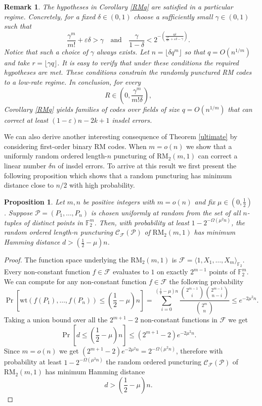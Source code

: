 \documentclass[draft, onecolumn, 11pt]{IEEEtran}
\newtheorem{proposition}[theorem]{Proposition}
\newtheorem{remark}[theorem]{Remark}
\newcommand{\F}{\mathbb{F}}
\begin{document}
\begin{remark}
    The hypotheses in Corollary \ref{RMq} are satisfied in a particular regime. Concretely, for a fixed $\delta \in (0,1)$ choose a sufficiently small $\gamma \in (0,1)$ such that 
    $$\frac{\gamma^m}{m!}+ \varepsilon\delta > \gamma \quad \text{and} \quad \frac{\gamma}{1-\delta} < 2^{-\left( \frac{4\delta}{\frac{\gamma^m}{m!}+\varepsilon\delta-\gamma}\right)}.$$
    Notice that such a choice of $\gamma$ always exists. Let $n=\lfloor\delta q^m\rfloor$ so that $q = O(n^{1/m})$ and take $r=\lfloor\gamma q\rfloor$. It is easy to verify that under these conditions the required hypotheses are met. These conditions constrain the randomly punctured RM codes to a low-rate regime. In conclusion, for every
    $$R\in\left(0,\frac{\gamma^m}{m!\delta}\right),$$ 
    Corollary \ref{RMq} yields families of codes over fields of size $q=O(n^{1/m})$ that can correct at least $(1 - \varepsilon)n - 2k + 1$ insdel errors.
\end{remark}

We can also derive another interesting consequence of  Theorem \ref{ultimate} by considering first-order binary RM codes. When $m = o(n)$ we show that a uniformly random ordered length-$n$ puncturing of $\mathrm{RM}_2(m,1)$ can correct a linear number $\delta n$ of insdel errors. To arrive at this result we first present the following proposition which shows that a random puncturing has minimum distance close to $n/2$ with high probability. 

\begin{proposition} \label{RM2mindist}
    Let $m,n$ be positive integers with $m = o(n)$ and fix $\mu \in \left(0,\frac{1}{2}\right)$. Suppose $\mathcal{P} = (P_1, \dots, P_n)$ is chosen uniformly at random from the set of all $n$-tuples of distinct points in $\F_2^m$. Then, with probability at least $1 - 2^{-\Omega(\mu^2n)}$, the random ordered length-$n$ puncturing $\mathcal{C_F(P)}$ of $\mathrm{RM}_2(m,1)$ has minimum Hamming distance $d > \left( \frac{1}{2} - \mu\right)n$.
\end{proposition}
\begin{proof}
    The function space underlying the $\mathrm{RM}_2(m,1)$ is $\mathcal{F} = \langle 1, X_1, \dots, X_m\rangle_{\F_2}$. Every non-constant function $f \in \mathcal{F}$ evaluates to $1$ on exactly $2^{m-1}$ points of $\F_2^m$. We can compute for any non-constant function $f \in \mathcal{F}$ the following probability 
    $$\Pr\left[\mathrm{wt}(f(P_1), \dots, f(P_n)) \leq  \left( \frac{1}{2} - \mu\right)n\right] = \sum_{i=0}^{\left( \frac{1}{2} - \mu\right)n}\frac{\binom{2^{m-1}}{i}\binom{2^{m-1}}{n-i}}{\binom{2^{m}}{n}} \leq e^{-2\mu^2n}.$$
    Taking a union bound over all the $2^{m+1}-2$ non-constant functions in $\mathcal{F}$ we get 
    $$\Pr\left[d\leq  \left( \frac{1}{2} - \mu\right)n\right] \leq (2^{m+1}-2)e^{-2\mu^2n}.$$
    Since $m = o(n)$ we get $(2^{m+1}-2)e^{-2\mu^2n} = 2^{-\Omega(\mu^2n)}$, therefore with probability at least $1 - 2^{-\Omega(\mu^2n)}$ the random ordered puncturing $\mathcal{C_F(P)}$ of $\mathrm{RM}_2(m,1)$ has minimum Hamming distance $$d > \left( \frac{1}{2} - \mu\right)n.$$
\end{proof}
\end{document}
